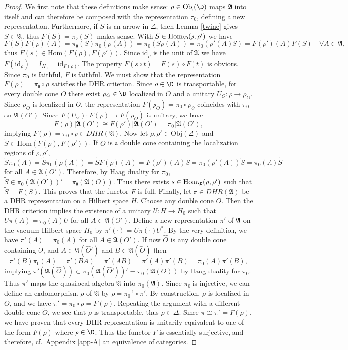 \documentclass[11pt]{article}
\newcommand{\alg}[1]{\mathfrak{#1}}
\theoremstyle{definition}
\theoremstyle{definition}
\theoremstyle{remark}
\newcommand{\Obj}{\mathrm{Obj}}
\def\al#1{{\mathfrak #1}}
\newcommand{\Hom}{\mathrm{Hom}}
\newcommand{\rarr}{\rightarrow}
\def\id{\mathrm{id}}
\begin{document}
\begin{proof}
  We first note that these definitions make sense:
  $\rho\in\Obj(\D)$ maps $\al A$ into itself and can
  therefore be composed with the representation
  $\pi_0$, defining a new representation. Furthermore,
  if $S$ is an arrow in $\Delta$, then Lemma
  \ref{twine} gives $S\in\al A$, thus $F(S)=\pi_0(S)$
  makes sense. With $S\in\Hom_\D(\rho,\rho')$ we have
  \[
  F(S)F(\rho)(A)=\pi_0(S)\pi_0(\rho(A))=\pi_0(S\rho(A))=\pi_0(\rho'(A)S)=F(\rho')(A)F(S)\quad\forall
  A\in\alg{A},\] thus $F(s)\in\Hom(F(\rho),F(\rho'))$. Since
  $\id_\rho$ is the unit of $\alg{A}$ we have
  $F(\id_\rho)=I_{H_0}=\id_{F(\rho)}$. The property $F(s\circ
  t)=F(s)\circ F(t)$ is obvious. Since $\pi_0$ is faithful, $F$ is
  faithful. We must show that the representation
  $F(\rho)=\pi_0\circ\rho$ satisfies the DHR criterion. Since
  $\rho\in\D$ is transportable, for every double cone $O$ there exist
  $\rho_O\in\D$ localized in $O$ and a unitary $U_O:\rho\rarr\rho_O$.
  Since $\rho_O$ is localized in $O$, the representation
  $F(\rho_O)=\pi_0\circ\rho_O$ coincides with $\pi_0$ on
  $\alg{A}(O')$. Since $F(U_O):F(\rho)\rarr F(\rho_O)$ is unitary, we
  have
\[ F(\rho)| \alg{A}(O')\cong F(\rho')| \alg{A}(O')=\pi_0|\alg{A}(O'), \]
implying $F(\rho)=\pi_0\circ\rho\in DHR(\alg{A})$. Now let $\rho,\rho'\in\Obj(\Delta)$ and 
$\tilde{S}\in\Hom(F(\rho),F(\rho'))$. If $O$ is a double cone containing the localization regions of $\rho,\rho'$,
\[
\tilde{S}\pi_0(A)=\tilde{S}\pi_0(\rho(A))=\tilde{S}F(\rho)(A)=F(\rho')(A)S=\pi_0(\rho'(A))\tilde{S}
=\pi_0(A)\tilde{S} \] for all $A\in\alg{A}(O')$.  Therefore, by Haag
duality for $\pi_0$,
$\tilde{S}\in\pi_0(\alg{A}(O'))'=\pi_0(\alg{A}(O))$. Thus there exists
$s\in\Hom_\D(\rho,\rho')$ such that $\tilde{S}=F(S)$. This proves that
the functor $F$ is full. Finally, let $\pi\in DHR(\alg{A})$ be a DHR
representation on a Hilbert space $H$. Choose any double cone $O$.
Then the DHR criterion implies the existence of a unitary $U:H\rarr
H_0$ such that $U\pi(A)=\pi_0(A)U$ for all $A\in\alg{A}(O')$. Define a
new representation $\pi'$ of $\alg{A}$ on the vacuum Hilbert space
$H_0$ by $\pi'(\cdot)=U\pi(\cdot)U^*$. By the very definition, we have
$\pi'(A)=\pi_0(A)$ for all $A\in\alg{A}(O')$. If now $\widehat{O}$ is
any double cone containing $O$, and $A\in\alg{A}(\widehat{O}')$ and
$B\in\alg{A}(\widehat{O})$ then
\[ \pi'(B)\pi_0(A)=\pi'(BA)=\pi'(AB)=\pi'(A)\pi'(B)=\pi_0(A)\pi'(B), \]
implying $\pi'(\alg{A}(\widehat{O}))\subset\pi_0(\alg{A}(\widehat{O}'))'=\pi_0(\alg{A}(O))$ by Haag duality for $\pi_0$. 
Thus $\pi'$ maps the quasilocal algebra $\alg{A}$ into $\pi_0(\alg{A})$. Since $\pi_0$ is injective, we can define an 
endomorphism $\rho$ of $\alg{A}$ by $\rho=\pi_0^{-1}\circ\pi'$. By construction, $\rho$ is localized in $O$, and we
have $\pi'=\pi_0\circ\rho=F(\rho)$. Repeating the argument with a different double cone $\tilde{O}$, we see that $\rho$ is
transportable, thus $\rho\in\Delta$. Since $\pi\cong\pi'=F(\rho)$, we have proven that every DHR representation is unitarily
equivalent to one of the form $F(\rho)$ where $\rho\in\D$. Thus the functor $F$ is essentially
surjective, and therefore, cf.\ Appendix \ref{app-A} an equivalence of categories.
\end{proof}
\end{document}
